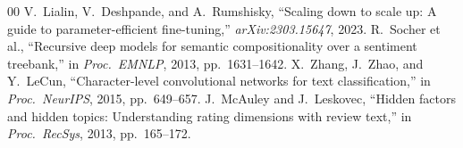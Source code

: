 \documentclass[conference]{IEEEtran}
\begin{document}
\begin{thebibliography}{00}
 V.\ Lialin, V.\ Deshpande, and A.\ Rumshisky, ``Scaling down to scale up: A guide to parameter-efficient fine-tuning,'' \textit{arXiv:2303.15647}, 2023.
 R.\ Socher et al., ``Recursive deep models for semantic compositionality over a sentiment treebank,'' in \textit{Proc.\ EMNLP}, 2013, pp.\ 1631--1642.
 X.\ Zhang, J.\ Zhao, and Y.\ LeCun, ``Character-level convolutional networks for text classification,'' in \textit{Proc.\ NeurIPS}, 2015, pp.\ 649--657.
 J.\ McAuley and J.\ Leskovec, ``Hidden factors and hidden topics: Understanding rating dimensions with review text,'' in \textit{Proc.\ RecSys}, 2013, pp.\ 165--172.
\end{thebibliography}
\end{document}
